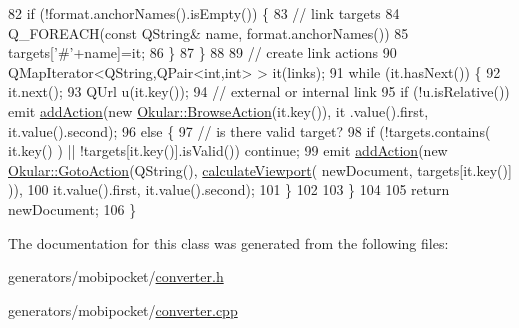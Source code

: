 \begin{DoxyCode}
82     \textcolor{keywordflow}{if} (!format.anchorNames().isEmpty()) \{
83       \textcolor{comment}{// link targets}
84       Q\_FOREACH(\textcolor{keyword}{const} QString& name, format.anchorNames()) 
85     targets[\textcolor{charliteral}{'#'}+name]=it;
86     \}
87   \}
88 
89   \textcolor{comment}{// create link actions}
90   QMapIterator<QString,QPair<int,int> > it(links);
91   \textcolor{keywordflow}{while} (it.hasNext()) \{
92     it.next();
93     QUrl u(it.key());
94     \textcolor{comment}{// external or internal link}
95     \textcolor{keywordflow}{if} (!u.isRelative()) emit \hyperlink{classOkular_1_1TextDocumentConverter_ac4f1b668547e87affede3663ea6d8bc6}{addAction}(\textcolor{keyword}{new} \hyperlink{classOkular_1_1BrowseAction}{Okular::BrowseAction}(it.key()), it
      .value().first, it.value().second);
96     \textcolor{keywordflow}{else} \{
97       \textcolor{comment}{// is there valid target?}
98       \textcolor{keywordflow}{if} (!targets.contains( it.key() ) || !targets[it.key()].isValid()) \textcolor{keywordflow}{continue};
99       emit \hyperlink{classOkular_1_1TextDocumentConverter_ac4f1b668547e87affede3663ea6d8bc6}{addAction}(\textcolor{keyword}{new} \hyperlink{classOkular_1_1GotoAction}{Okular::GotoAction}(QString(), 
      \hyperlink{classOkular_1_1TextDocumentConverter_a5d8709540be1213da6dac78759ce7172}{calculateViewport}( newDocument, targets[it.key()] )),
100         it.value().first, it.value().second);
101     \}
102     
103   \}
104 
105   \textcolor{keywordflow}{return} newDocument;
106 \}
\end{DoxyCode}


The documentation for this class was generated from the following files\+:\begin{DoxyCompactItemize}
\item 
generators/mobipocket/\hyperlink{mobipocket_2converter_8h}{converter.\+h}\item 
generators/mobipocket/\hyperlink{mobipocket_2converter_8cpp}{converter.\+cpp}\end{DoxyCompactItemize}
